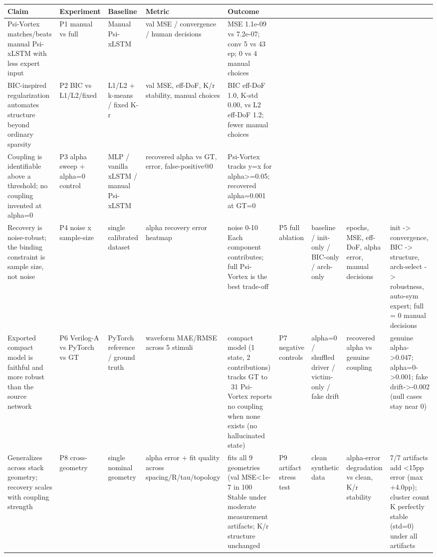 \begin{tabular}{lllll}
\toprule
Claim & Experiment & Baseline & Metric & Outcome \\
\midrule
Psi-Vortex matches/beats manual Psi-xLSTM with less expert input & P1 manual vs full & Manual Psi-xLSTM & val MSE / convergence / human decisions & MSE 1.1e-09 vs 7.2e-07; conv 5 vs 43 ep; 0 vs 4 manual choices \\
BIC-inspired regularization automates structure beyond ordinary sparsity & P2 BIC vs L1/L2/fixed & L1/L2 + k-means / fixed K-r & val MSE, eff-DoF, K/r stability, manual choices & BIC eff-DoF 1.0, K-std 0.00, vs L2 eff-DoF 1.2; fewer manual choices \\
Coupling is identifiable above a threshold; no coupling invented at alpha=0 & P3 alpha sweep + alpha=0 control & MLP / vanilla xLSTM / manual Psi-xLSTM & recovered alpha vs GT, error, false-positive@0 & Psi-Vortex tracks y=x for alpha>=0.05; recovered alpha=0.001 at GT=0 \\
Recovery is noise-robust; the binding constraint is sample size, not noise & P4 noise x sample-size & single calibrated dataset & alpha recovery error heatmap & noise 0-10%
Each component contributes; full Psi-Vortex is the best trade-off & P5 full ablation & baseline / init-only / BIC-only / arch-only & epochs, MSE, eff-DoF, alpha error, manual decisions & init -> convergence, BIC -> structure, arch-select -> robustness, auto-sym ~ expert; full = 0 manual decisions \\
Exported compact model is faithful and more robust than the source network & P6 Verilog-A vs PyTorch vs GT & PyTorch reference / ground truth & waveform MAE/RMSE across 5 stimuli & compact model (1 state, 2 contributions) tracks GT to ~31%
Psi-Vortex reports no coupling when none exists (no hallucinated state) & P7 negative controls & alpha=0 / shuffled driver / victim-only / fake drift & recovered alpha vs genuine coupling & genuine alpha->0.047; alpha=0->0.001; fake drift->-0.002 (null cases stay near 0) \\
Generalizes across stack geometry; recovery scales with coupling strength & P8 cross-geometry & single nominal geometry & alpha error + fit quality across spacing/R/tau/topology & fits all 9 geometries (val MSE<1e-7 in 100%
Stable under moderate measurement artifacts; K/r structure unchanged & P9 artifact stress test & clean synthetic data & alpha-error degradation vs clean, K/r stability & 7/7 artifacts add <15pp error (max +4.0pp); cluster count K perfectly stable (std=0) under all artifacts \\
\bottomrule
\end{tabular}
